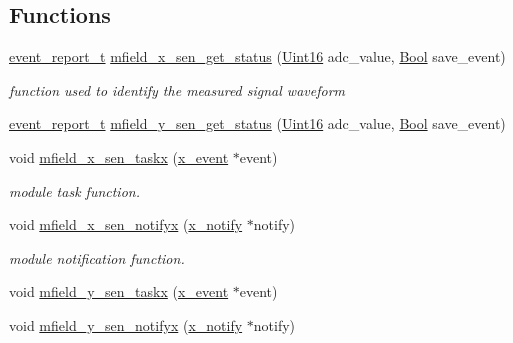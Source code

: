 \subsection*{Functions}
\begin{DoxyCompactItemize}
\item 
\hyperlink{a00021_d6/d66/a00441}{event\+\_\+report\+\_\+t} \hyperlink{a00019_a3a46d0e69b27b3566e6d8465cf7a8b0a}{mfield\+\_\+x\+\_\+sen\+\_\+get\+\_\+status} (\hyperlink{a00072_a59a9f6be4562c327cbfb4f7e8e18f08b}{Uint16} adc\+\_\+value, \hyperlink{a00072_a253b248072cfc8bd812c69acd0046eed}{Bool} save\+\_\+event)
\begin{DoxyCompactList}\small\item\em function used to identify the measured signal waveform \end{DoxyCompactList}\item 
\hyperlink{a00021_d6/d66/a00441}{event\+\_\+report\+\_\+t} \hyperlink{a00019_ac7134882964fedc18be6c75547987a2c}{mfield\+\_\+y\+\_\+sen\+\_\+get\+\_\+status} (\hyperlink{a00072_a59a9f6be4562c327cbfb4f7e8e18f08b}{Uint16} adc\+\_\+value, \hyperlink{a00072_a253b248072cfc8bd812c69acd0046eed}{Bool} save\+\_\+event)
\item 
void \hyperlink{a00019_a72e9235043dc4a8469143a6eb48bf117}{mfield\+\_\+x\+\_\+sen\+\_\+taskx} (\hyperlink{a00036_de/d37/a00849}{x\+\_\+event} $\ast$event)
\begin{DoxyCompactList}\small\item\em module task function. \end{DoxyCompactList}\item 
void \hyperlink{a00019_ac28a2b5f3fa92c0593446e15a63a501c}{mfield\+\_\+x\+\_\+sen\+\_\+notifyx} (\hyperlink{a00036_df/d4c/a00851}{x\+\_\+notify} $\ast$notify)
\begin{DoxyCompactList}\small\item\em module notification function. \end{DoxyCompactList}\item 
void \hyperlink{a00019_adfb4e8d328a4cd1c7639082bef5841a9}{mfield\+\_\+y\+\_\+sen\+\_\+taskx} (\hyperlink{a00036_de/d37/a00849}{x\+\_\+event} $\ast$event)
\item 
void \hyperlink{a00019_a80b82366f7d22e925f279d20328f05c8}{mfield\+\_\+y\+\_\+sen\+\_\+notifyx} (\hyperlink{a00036_df/d4c/a00851}{x\+\_\+notify} $\ast$notify)
\end{DoxyCompactItemize}
